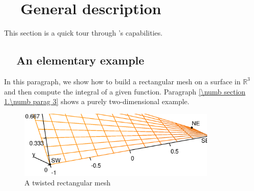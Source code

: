 
\chapter{~~General description}\label{\numb section 1}

This section is a quick tour through \maniFEM's capabilities.


\section{~~An elementary example}\label{\numb section 1.\numb parag 1}

In this paragraph, we show how to build a rectangular mesh on a surface in $ \mathbb{R}^3 $ 
and then compute the integral of a given function.
Paragraph \ref{\numb section 1.\numb parag 3} shows a purely two-dimensional example.

\begin{figure} \centering
  \includegraphics[width=95mm]{3d-rectangle}
  \caption{A twisted rectangular mesh}
  \label{\numb section 1.\numb fig 1}
\end{figure}

